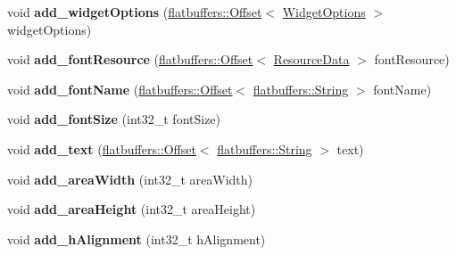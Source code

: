 \begin{DoxyCompactItemize}
void {\bfseries add\+\_\+widget\+Options} (\hyperlink{structflatbuffers_1_1Offset}{flatbuffers\+::\+Offset}$<$ \hyperlink{structflatbuffers_1_1WidgetOptions}{Widget\+Options} $>$ widget\+Options)
\item 
\mbox{\label{structflatbuffers_1_1TextOptionsBuilder_a2e49df25d6624702efa3022fc8ca09fd}} 
void {\bfseries add\+\_\+font\+Resource} (\hyperlink{structflatbuffers_1_1Offset}{flatbuffers\+::\+Offset}$<$ \hyperlink{structflatbuffers_1_1ResourceData}{Resource\+Data} $>$ font\+Resource)
\item 
\mbox{\label{structflatbuffers_1_1TextOptionsBuilder_ac26639b895d0343880cd520fb3626404}} 
void {\bfseries add\+\_\+font\+Name} (\hyperlink{structflatbuffers_1_1Offset}{flatbuffers\+::\+Offset}$<$ \hyperlink{structflatbuffers_1_1String}{flatbuffers\+::\+String} $>$ font\+Name)
\item 
\mbox{\label{structflatbuffers_1_1TextOptionsBuilder_abc88e7d931727b43dc0b29a56b707944}} 
void {\bfseries add\+\_\+font\+Size} (int32\+\_\+t font\+Size)
\item 
\mbox{\label{structflatbuffers_1_1TextOptionsBuilder_a63da3563d7ce07503cbb0f06ba752f32}} 
void {\bfseries add\+\_\+text} (\hyperlink{structflatbuffers_1_1Offset}{flatbuffers\+::\+Offset}$<$ \hyperlink{structflatbuffers_1_1String}{flatbuffers\+::\+String} $>$ text)
\item 
\mbox{\label{structflatbuffers_1_1TextOptionsBuilder_aa061c13bd1bb2adcaa98bb568fce47a2}} 
void {\bfseries add\+\_\+area\+Width} (int32\+\_\+t area\+Width)
\item 
\mbox{\label{structflatbuffers_1_1TextOptionsBuilder_a961080d3c04e674656c875971318d87e}} 
void {\bfseries add\+\_\+area\+Height} (int32\+\_\+t area\+Height)
\item 
\mbox{\label{structflatbuffers_1_1TextOptionsBuilder_a5e044d4747dbbc81832e9e588be26f14}} 
void {\bfseries add\+\_\+h\+Alignment} (int32\+\_\+t h\+Alignment)
\item 

\end{DoxyCompactItemize}
